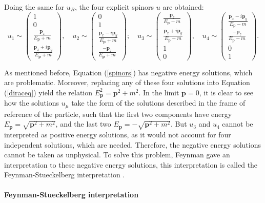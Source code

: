 Doing the same for $u_B$, the four explicit spinors $u$ are obtained:
\begin{equation}
\label{spinors}
u_1 \sim \left( \begin{array}{c}
1 \\
0 \\
\frac{\bm{p}_z}{E_{\bm{p}} + m} \\
\frac{\bm{p}_x + i\bm{p}_y}{E_{\bm{p}} + m} \end{array} \right), \quad 
u_2 \sim \left( \begin{array}{c}
0 \\
1 \\
\frac{\bm{p}_x - i\bm{p}_y}{E_{\bm{p}} + m} \\
\frac{-\bm{p}_z}{E_{\bm{p}} + m} \end{array} \right); \quad
u_3 \sim \left( \begin{array}{c}
\frac{\bm{p}_z}{E_{\bm{p}} - m} \\
\frac{\bm{p}_x + i\bm{p}_y}{E_{\bm{p}} - m} \\
1 \\
0 \end{array} \right), \quad
u_4 \sim \left( \begin{array}{c}
\frac{\bm{p}_x - i\bm{p}_y}{E_{\bm{p}} - m} \\
\frac{-\bm{p}_z}{E_{\bm{p}} - m} \\
0 \\
1 \end{array} \right).
\end{equation}

As mentioned before, Equation (\ref{spinors}) has negative energy solutions, which are problematic. Moreover, replacing any of these four solutions into Equation (\ref{diraceq}) yield the relation $E^2_{\bm{p}} = \bm{p}^2 + m^2$. In the limit $\bm{p} = 0$, it is clear to see how the solutions $u_{\mu}$ take the form of the solutions described in the frame of reference of the particle, such that the first two components have energy $E_{\bm{p}}=\sqrt{\bm{p}^2 + m^2}$, and the last two $E_{\bm{p}}=-\sqrt{\bm{p}^2 + m^2}$. But $u_3$ and $u_4$ cannot be interpreted as positive energy solutions, as it would not account for four independent solutions, which are needed. Therefore, the negative energy solutions cannot be taken as unphysical. To solve this problem, Feynman gave an interpretation to these negative energy solutions, this interpretation is called the Feynman-Stueckelberg interpretation \cite{Thomson}.

\paragraph{Feynman-Stueckelberg interpretation} \label{ssec:feynrep}

